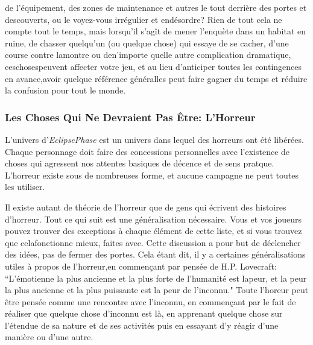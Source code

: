 {de l'équipement, des zones de maintenance et autres le tout derrière des portes et descouverts, ou le voyez-vous irrégulier et endésordre? Rien de tout cela ne compte tout le temps, mais lorsqu'il s'agît de mener l'enquète dans un habitat en ruine, de chasser quelqu'un (ou quelque chose) qui essaye de se cacher, d'une course contre lamontre ou den'importe quelle autre complication dramatique, ceschosespeuvent affecter votre jeu, et au lieu d'anticiper toutes les contingences en avance,avoir quelque référence généralles peut faire gagner du temps et réduire la confusion pour tout le monde. 

\subsubsection{Les Choses Qui Ne Devraient Pas Être: L'Horreur} 

L'univers d'\textit{EclipsePhase} est un univers dans lequel des horreurs ont été libérées. Chaque personnage doit faire des concessions personnelles avec l'existence de choses qui agressent nos attentes basiques de décence et de sens pratque. L'horreur existe sous de nombreuses forme, et aucune campagne ne peut toutes les utiliser. 

Il existe autant de théorie de l'horreur que de gens qui écrivent des histoires d'horreur. Tout ce qui suit est une généralisation nécessaire. Vous et vos joueurs pouvez trouver des exceptions à chaque élément de cette liste, et si vous trouvez que celafonctionne mieux, faites avec. Cette discussion a pour but de déclencher des idées, pas de fermer des portes. Cela étant dit, il y a certaines généralisations utiles à propos de l'horreur,en commençant par pensée de H.P. Lovecraft: ``L'émotienne la plus ancienne et la plus forte de l'humanité est lapeur, et la peur la plus ancienne et la plus puissante est la peur de l'inconnu." Toute l'horeur peut être pensée comme une rencontre avec l'inconnu, en commençant par le fait de réaliser que quelque chose d'inconnu est là, en apprenant quelque chose sur l'étendue de sa nature et de ses activités puis en essayant d'y réagir d'une manière ou d'une autre. 

}
